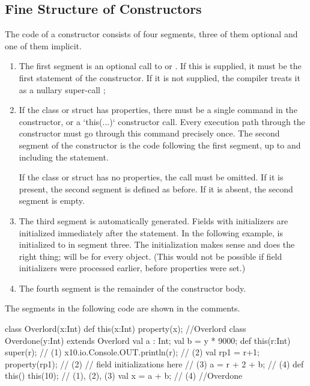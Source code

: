 \subsection{Fine Structure of Constructors}
\label{SFineStructCtors}

The code of a constructor consists of four segments, three of them optional
and one of them implicit.
\begin{enumerate}
\item The first segment is an optional call to  or
      .  If this is supplied, it must be the first statement
      of the constructor.  If it is not supplied, the compiler treats it as a
      nullary super-call ;
\item If the class or struct has properties, there must be a single
       command in the constructor, or a \xcd`this(...)`
      constructor call.  Every execution path
      through the constructor must go through this  command
      precisely once.   The second segment of the constructor is the code
      following the first segment, up to and including the 
      statement.

      If the class or struct has no properties, the  call must
      be omitted. If it is present, the second segment is defined as before.  If
      it is absent, the second segment is empty.
\item The third segment is automatically generated.  Fields with initializers
      are initialized immediately after the  statement.
      In the following example,  is initialized to  in
      segment three.  The initialization makes sense and does the right
      thing;  will be  for every  object.
      (This would not be possible if field initializers were processed
      earlier, before properties were set.)
\item The fourth segment is the remainder of the constructor body.
\end{enumerate}

The segments in the following code are shown in the comments.
\begin{xten}
class Overlord(x:Int) {
  def this(x:Int) { property(x); }
}//Overlord
class Overdone(y:Int) extends Overlord  {
  val a : Int;
  val b =  y * 9000;
  def this(r:Int) {
    super(r);                      // (1)
    x10.io.Console.OUT.println(r); // (2)
    val rp1 = r+1;
    property(rp1);                 // (2)
    // field initializations here  // (3)
    a = r + 2 + b;                 // (4)
  }
  def this() {
    this(10);                      // (1), (2), (3)
    val x = a + b;                 // (4)
  }
}//Overdone
\end{xten}
%

